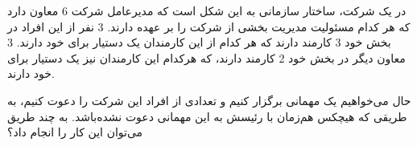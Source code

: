 \p
در یک شرکت، ساختار سازمانی به این شکل است که
    مدیرعامل شرکت 6 معاون دارد که هر کدام مسئولیت مدیریت بخشی از شرکت را بر عهده دارند.
    3 نفر از این افراد در بخش خود 3 کارمند دارند که هر کدام از این کارمندان یک دستیار برای خود دارند. 3 معاون دیگر در بخش خود 2 کارمند دارند، 
    که هرکدام این کارمندان نیز یک دستیار برای خود دارند.
    
\p
حال می‌خواهیم یک مهمانی برگزار کنیم و تعدادی از افراد این شرکت را دعوت کنیم، 
    به طریقی که هیچکس هم‌زمان با رئیسش به این مهمانی دعوت نشده‌باشد. 
    به چند طریق می‌توان این کار را انجام داد؟